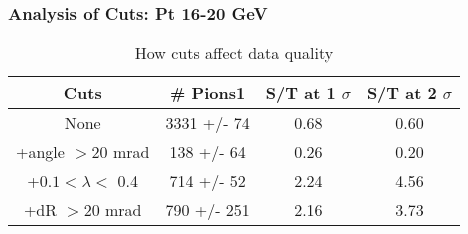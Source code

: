 \frame
{
\frametitle{Analysis of Cuts: Pt 16-20 GeV}
\begin{table}
\caption{How cuts affect data quality}
\centering
\begin{tabular}{c c c c}
\hline\hline
Cuts & \# Pions1 & S/T at 1 $\sigma$ & S/T at 2 $\sigma$ \\ [0.5ex]
\hline
None & 3331 +/-   74 & 0.68 & 0.60 \\ %
+angle $> 20$ mrad &  138 +/-   64 & 0.26 & 0.20 \\ %
+$0.1 < \lambda <$ 0.4 &  714 +/-   52 & 2.24 & 4.56 \\ %
+dR $> 20$ mrad &  790 +/-  251 & 2.16 & 3.73 \\ %
[1ex]
\hline
\end{tabular}
\label{table:nonlin}
\end{table}
}
